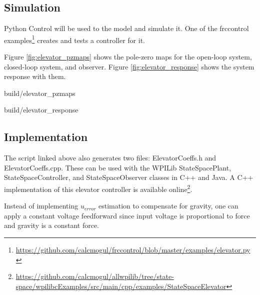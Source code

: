 \subsection{Simulation}

Python Control will be used to  the
\gls{model} and simulate it. One of the frccontrol
examples\footnote{\url{https://github.com/calcmogul/frccontrol/blob/master/examples/elevator.py}}
creates and tests a controller for it.

Figure \ref{fig:elevator_pzmaps} shows the pole-zero maps for the open-loop
\gls{system}, closed-loop \gls{system}, and \gls{observer}. Figure
\ref{fig:elevator_response} shows the \gls{system} response with them.

\begin{svg}{build/elevator_pzmaps}
  \caption{Elevator pole-zero maps}
  \label{fig:elevator_pzmaps}
\end{svg}

\begin{svg}{build/elevator_response}
  \caption{Elevator response}
  \label{fig:elevator_response}
\end{svg}

\subsection{Implementation}

The script linked above also generates two files: ElevatorCoeffs.h and
ElevatorCoeffs.cpp. These can be used with the WPILib StateSpacePlant,
StateSpaceController, and StateSpaceObserver classes in C++ and Java. A C++
implementation of this elevator controller is available online\footnote{
\url{https://github.com/calcmogul/allwpilib/tree/state-space/wpilibcExamples/src/main/cpp/examples/StateSpaceElevator}}.

\begin{remark}
  Instead of implementing $u_{error}$ estimation to compensate for gravity, one
  can apply a constant voltage feedforward since input voltage is proportional
  to force and gravity is a constant force.
\end{remark}

